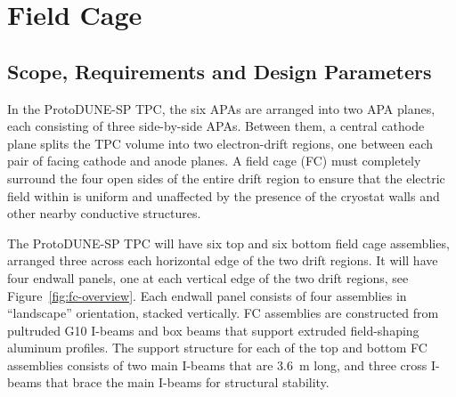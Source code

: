 



\section{Field Cage}
\label{detcompsec-fc}
\subsection{Scope, Requirements and Design Parameters}

In the ProtoDUNE-SP TPC, 
the six APAs are arranged into two APA planes, each consisting of three side-by-side APAs. Between them,  
a central cathode plane splits the TPC volume into two
electron-drift regions, one between
each pair of facing cathode and anode planes. %
A field cage (FC) must completely surround the four
open sides of the entire drift %
region %
to ensure that the %
 electric field within is uniform and unaffected by the presence
of the cryostat walls and other nearby conductive structures.


The ProtoDUNE-SP TPC will have six top and six bottom field cage assemblies, arranged three across each horizontal edge of the two drift regions. It will have 
four endwall panels, one at each vertical edge of the two drift regions, see Figure~\ref{fig:fc-overview}.
Each endwall panel consists of four assemblies in ``landscape'' orientation, stacked vertically.
FC assemblies are constructed from pultruded G10 I-beams and box beams that support extruded field-shaping aluminum profiles. The support structure for each of the top and bottom FC assemblies consists of two main I-beams that are 3.6~m long, and three cross I-beams that brace the main I-beams for structural stability.


